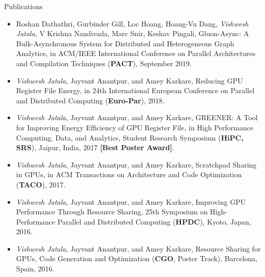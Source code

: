 \documentclass{resume} %
\begin{document}
\begin{rSection}{Publications}
\begin{itemize}
\item Roshan Dathathri, Gurbinder Gill, Loc Hoang, Hoang-Vu Dang, \textit{Vishwesh Jatala}, V Krishna Nandivada, Marc Snir, Keshav Pingali, Gluon-Async: A Bulk-Asynchronous System for Distributed and Heterogeneous Graph Analytics, in ACM/IEEE International Conference on Parallel Architectures and Compilation Techniques (\textbf{PACT}), September 2019.
\item \textit{Vishwesh Jatala}, Jayvant Anantpur, and Amey Karkare, Reducing GPU Register File Energy, in 24th International European Conference on Parallel and Distributed Computing (\textbf{Euro-Par}), 2018. 
\item \textit{Vishwesh Jatala}, Jayvant Anantpur, and Amey Karkare, GREENER: A Tool for Improving Energy Efficiency of GPU Register File, in High Performance Computing, Data, and Analytics, Student Research Symposium (\textbf{HiPC, SRS}), Jaipur, India, 2017 \textbf{[Best Poster Award]}. 
\item \textit{Vishwesh Jatala}, Jayvant Anantpur, and Amey Karkare, Scratchpad Sharing in GPUs, in ACM Transactions on Architecture and Code Optimization (\textbf{TACO}), 2017. 
\item \textit{Vishwesh Jatala}, Jayvant Anantpur, and Amey Karkare, Improving GPU Performance Through Resource Sharing, 25th Symposium on High-Performance Parallel and Distributed Computing (\textbf{HPDC}), Kyoto, Japan, 2016.
\item \textit{Vishwesh Jatala}, Jayvant Anantpur, and Amey Karkare, Resource Sharing for GPUs, Code Generation and Optimization (\textbf{CGO}, Poster Track), Barcelona, Spain, 2016.
\end{itemize}
\end{rSection}

\pagebreak


\end{document}
